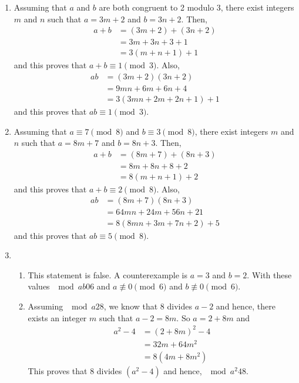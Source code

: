 \begin{enumerate}
\item Assuming that $a$ and $b$ are both congruent to 2 modulo 3, there exist integers $m$ and $n$ such that $a = 3m + 2$ and $b = 3n + 2$.  Then,
\begin{align*}
a + b &= (3m + 2) + (3n + 2) \\
      &= 3m + 3n + 3 + 1 \\
      &= 3(m + n + 1) + 1
\end{align*}
and this proves that $a + b \equiv 1 \pmod 3$.  Also,
\begin{align*}
ab &= (3m + 2)(3n + 2) \\
   &= 9mn + 6m + 6n + 4 \\
   &= 3(3mn + 2m + 2n + 1 ) + 1
\end{align*}
and this proves that $ab \equiv 1 \pmod 3$.



\item Assuming that $a \equiv 7 \pmod 8$ and $b \equiv 3 \pmod 8$, there exist integers $m$ and $n$ such that $a = 8m + 7$ and $b = 8n + 3$.  Then,
\begin{align*}
a + b &= (8m + 7) + (8n + 3) \\
      &= 8m + 8n + 8 + 2 \\
      &= 8(m + n + 1) + 2
\end{align*}
and this proves that $a + b \equiv 2 \pmod 8$.  Also,
\begin{align*}
ab &= (8m + 7)(8n + 3) \\
   &= 64mn + 24m + 56n + 21 \\
   &= 8(8mn + 3m + 7n + 2) + 5
\end{align*}
and this proves that $ab \equiv 5 \pmod 8$.



\item \begin{enumerate}
\item This statement is false.  A counterexample is $a = 3$ and $b = 2$.  With these values 
$\mod{ab}{0}{6}$ and $a \not \equiv 0 \pmod 6$  and $b \not \equiv 0 \pmod 6$.


\item Assuming $\mod{a}{2}{8}$, we know that 8 divides $a - 2$ and hence, there exists an integer $m$ such that $a - 2 = 8m$.  So $a = 2 + 8m$ and
\begin{align*}
a^2 - 4 &= (2 + 8m)^2 - 4 \\
        &= 32m + 64m^2 \\
        &= 8 \left( 4m + 8m^2 \right)
\end{align*}
This proves that 8 divides $\left( a^2 - 4 \right)$ and hence, $\mod{a^2}{4}{8}$.



\end{enumerate}
\end{enumerate}
